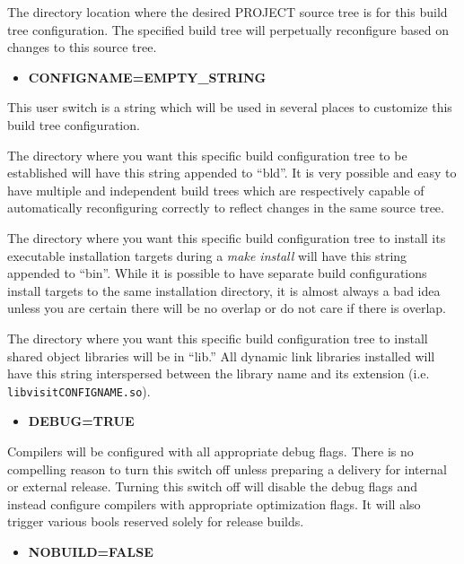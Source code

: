 \documentclass[12pt,letterpaper]{article}
\begin{document}
The directory location where the desired PROJECT source tree is for this build tree configuration.  The specified build tree will perpetually reconfigure based on changes to this source tree.

\begin{itemize}
\item \textbf{CONFIGNAME=EMPTY\_STRING}
\end{itemize}

This user switch is a string which will be used in several places to customize this build tree configuration.

The directory where you want this specific build configuration tree to be established will have this string appended to ``bld''.  It is very possible and easy to have multiple and independent build trees which are respectively capable of automatically reconfiguring correctly to reflect changes in the same source tree.

The directory where you want this specific build configuration tree to install its executable installation targets during a \emph{make install} will have this string appended to ``bin''.  While it is possible to have separate build configurations install targets to the same installation directory, it is almost always a bad idea unless you are certain there will be no overlap or do not care if there is overlap.

The directory where you want this specific build configuration tree to install shared object libraries will be in ``lib.''  All dynamic link libraries installed will have this string interspersed between the library name and its extension (i.e. \verb|libvisitCONFIGNAME.so|).

\begin{itemize}
\item \textbf{DEBUG=TRUE}
\end{itemize}

Compilers will be configured with all appropriate debug flags.  There is no compelling reason to turn this switch off unless preparing a delivery for internal or external release.  Turning this switch off will disable the debug flags and instead configure compilers with appropriate optimization flags.  It will also trigger various bools reserved solely for release builds.

\begin{itemize}
\item \textbf{NOBUILD=FALSE}
\end{itemize}
\end{document}
